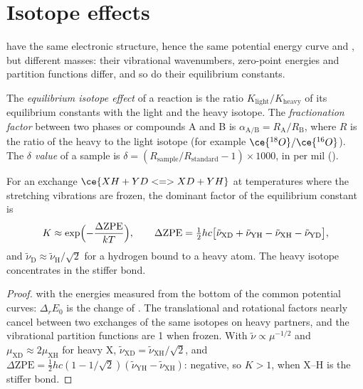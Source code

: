 \section{Isotope effects}

 have the same electronic structure, hence the same potential
energy curve and , but different masses: their vibrational
wavenumbers, zero-point energies and partition functions differ, and so do
their equilibrium constants.

\begin{definition}\label{def:b3:statistical-thermo-applied:isotope-effect}
The \emph{equilibrium isotope effect} of a
reaction is the ratio $K_{\mathrm{light}}/K_{\mathrm{heavy}}$ of its equilibrium constants with the
light and the heavy isotope. The \emph{fractionation factor}
between two phases or compounds A and B is $\alpha_{\mathrm{A/B}} = R_{\mathrm A}/R_{\mathrm B}$, where
$R$ is the ratio of the heavy to the light isotope (for example $\ce{^{18}O}/\ce{^{16}O}$). The
\emph{$\delta$ value} of a sample is $\delta = (R_{\mathrm{sample}}/R_{\mathrm{standard}}
- 1) \times 1000$, in per mil (\textperthousand).
\end{definition}

\begin{proposition}\label{prop:b3:statistical-thermo-applied:zpe-isotope}
For an exchange $\ce{XH + YD <=> XD + YH}$ at temperatures where the stretching
vibrations are frozen, the dominant factor of the equilibrium constant is
\[
  K \approx \exp\Bigl(-\frac{\Delta\mathrm{ZPE}}{kT}\Bigr), \qquad
  \Delta\mathrm{ZPE} = \tfrac12hc\bigl[\tilde\nu_{\mathrm{XD}} + \tilde\nu_{\mathrm{YH}} - \tilde\nu_{\mathrm{XH}} - \tilde\nu_{\mathrm{YD}}\bigr],
\]
and $\tilde\nu_{\mathrm D} \approx \tilde\nu_{\mathrm H}/\sqrt2$ for a hydrogen bound to a heavy atom. The heavy
isotope concentrates in the stiffer bond.
\end{proposition}

\begin{proof}
 with the energies measured
from the bottom of the common potential curves: $\Delta_rE_0$ is the change of
. The translational and rotational factors nearly cancel
between two exchanges of the same isotopes on heavy partners, and the
vibrational partition functions are 1 when frozen. With $\tilde\nu \propto \mu^{-1/2}$ and
$\mu_{\mathrm{XD}} \approx 2\mu_{\mathrm{XH}}$ for heavy X, $\tilde\nu_{\mathrm{XD}} = \tilde\nu_{\mathrm{XH}}/\sqrt2$, and $\Delta\mathrm{ZPE} =
\frac12hc(1 - 1/\sqrt2)(\tilde\nu_{\mathrm{YH}} - \tilde\nu_{\mathrm{XH}})$: negative, so $K > 1$, when X--H is the
stiffer bond.
\end{proof}

